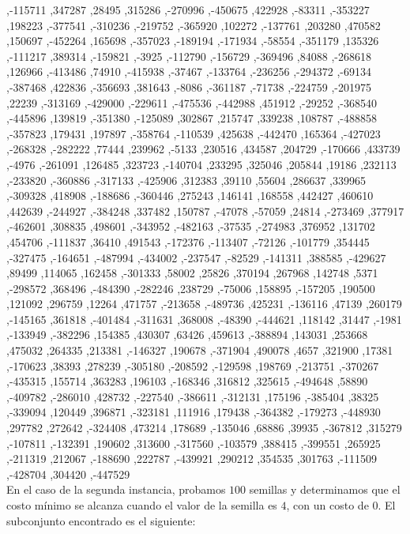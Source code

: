 \documentclass[spanish,12pt,letterpaper]{article}
\begin{document}
,-115711 ,347287 ,28495 ,315286 ,-270996 ,-450675 ,422928 ,-83311 ,-353227 ,198223 ,-377541 ,-310236 ,-219752 ,-365920 ,102272 ,-137761 ,203280 ,470582 ,150697 ,-452264 ,165698 ,-357023 ,-189194 ,-171934 ,-58554 ,-351179 ,135326 ,-111217 ,389314 ,-159821 ,-3925 ,-112790 ,-156729 ,-369496 ,84088 ,-268618 ,126966 ,-413486 ,74910 ,-415938 ,-37467 ,-133764 ,-236256 ,-294372 ,-69134 ,-387468 ,422836 ,-356693 ,381643 ,-8086 ,-361187 ,-71738 ,-224759 ,-201975 ,22239 ,-313169 ,-429000 ,-229611 ,-475536 ,-442988 ,451912 ,-29252 ,-368540 ,-445896 ,139819 ,-351380 ,-125089 ,302867 ,215747 ,339238 ,108787 ,-488858 ,-357823 ,179431 ,197897 ,-358764 ,-110539 ,425638 ,-442470 ,165364 ,-427023 ,-268328 ,-282222 ,77444 ,239962 ,-5133 ,230516 ,434587 ,204729 ,-170666 ,433739 ,-4976 ,-261091 ,126485 ,323723 ,-140704 ,233295 ,325046 ,205844 ,19186 ,232113 ,-233820 ,-360886 ,-317133 ,-425906 ,312383 ,39110 ,55604 ,286637 ,339965 ,-309328 ,418908 ,-188686 ,-360446 ,275243 ,146141 ,168558 ,442427 ,460610 ,442639 ,-244927 ,-384248 ,337482 ,150787 ,-47078 ,-57059 ,24814 ,-273469 ,377917 ,-462601 ,308835 ,498601 ,-343952 ,-482163 ,-37535 ,-274983 ,376952 ,131702 ,454706 ,-111837 ,36410 ,491543 ,-172376 ,-113407 ,-72126 ,-101779 ,354445 ,-327475 ,-164651 ,-487994 ,-434002 ,-237547 ,-82529 ,-141311 ,388585 ,-429627 ,89499 ,114065 ,162458 ,-301333 ,58002 ,25826 ,370194 ,267968 ,142748 ,5371 ,-298572 ,368496 ,-484390 ,-282246 ,238729 ,-75006 ,158895 ,-157205 ,190500 ,121092 ,296759 ,12264 ,471757 ,-213658 ,-489736 ,425231 ,-136116 ,47139 ,260179 ,-145165 ,361818 ,-401484 ,-311631 ,368008 ,-48390 ,-444621 ,118142 ,31447 ,-1981 ,-133949 ,-382296 ,154385 ,430307 ,63426 ,459613 ,-388894 ,143031 ,253668 ,475032 ,264335 ,213381 ,-146327 ,190678 ,-371904 ,490078 ,4657 ,321900 ,17381 ,-170623 ,38393 ,278239 ,-305180 ,-208592 ,-129598 ,198769 ,-213751 ,-370267 ,-435315 ,155714 ,363283 ,196103 ,-168346 ,316812 ,325615 ,-494648 ,58890 ,-409782 ,-286010 ,428732 ,-227540 ,-386611 ,-312131 ,175196 ,-385404 ,38325 ,-339094 ,120449 ,396871 ,-323181 ,111916 ,179438 ,-364382 ,-179273 ,-448930 ,297782 ,272642 ,-324408 ,473214 ,178689 ,-135046 ,68886 ,39935 ,-367812 ,315279 ,-107811 ,-132391 ,190602 ,313600 ,-317560 ,-103579 ,388415 ,-399551 ,265925 ,-211319 ,212067 ,-188690 ,222787 ,-439921 ,290212 ,354535 ,301763 ,-111509 ,-428704 ,304420 ,-447529\\
	
	
	En el caso de la segunda instancia, probamos $100$ semillas y determinamos que el costo mínimo se alcanza cuando el valor de la semilla es $4$, con un costo de $0$. El subconjunto encontrado es el siguiente:\\
	
\end{document}
